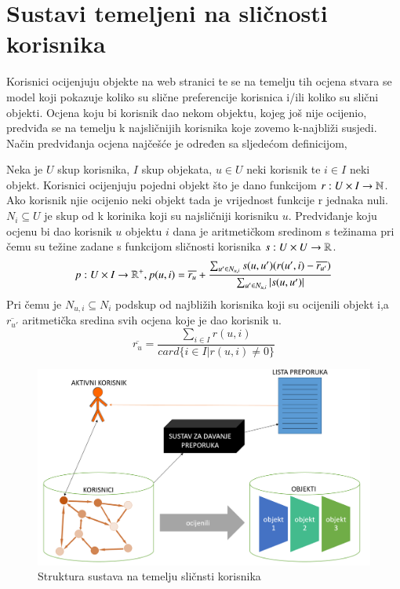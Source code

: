 \documentclass[a4paper,oneside,12pt]{memoir} %
\begin{document}
\section{Sustavi temeljeni na sličnosti korisnika}
%
Korisnici ocijenjuju objekte na web stranici te se na temelju tih ocjena stvara se model koji pokazuje koliko su slične preferencije korisnica i/ili koliko su slični objekti. Ocjena koju bi korisnik dao nekom objektu, kojeg još nije ocijenio, predviđa se na temelju k najsličnijih korisnika koje zovemo k-najbliži susjedi. Način predviđanja ocjena najčešće je određen sa sljedećom definicijom,
\begin{defn}
Neka je $U$ skup korisnika, $I$ skup objekata, $u\in U$ neki korisnik te $i\in I$ neki objekt. Korisnici ocijenjuju pojedni objekt što je dano funkcijom $r:U\times I \rightarrow \mathbb{N}$. Ako korisnik njie ocijenio neki objekt tada je vrijednost funkcije r jednaka nuli. $N_i \subseteq U$ je skup od k korinika koji su najsličniji korisniku $u$. Predviđanje koju ocjenu bi dao korisnik $u$ objektu $i$ dana je aritmetičkom sredinom s težinama pri čemu su težine zadane s funkcijom sličnosti korisnika $s:U\times U\rightarrow \mathbb{R}$. 
\[ p:U\times I \rightarrow \mathbb{R}^+, p(u,i) = \overline{r_{u}}+\frac{\sum_{u'\in N_{u,i}}s(u,u')(r(u',i)-\overline{r_{u'}})}{\sum_{u'\in N_{u,i}}|s(u,u')|} \]
Pri čemu je $N_{u,i} \subseteq N_i$ podskup od najbližih korisnika koji su ocijenili objekt i,a $\overline{r_{u'}}$ aritmetička sredina svih ocjena koje je dao korisnik u.
\[ \overline{r_{u}}=\frac{\sum_{i\in I}r(u,i)}{card\{i\in I | r(u,i) \neq 0 \} } \]
\end{defn}
\begin{figure}
\begin{center}
\includegraphics[scale=0.4]{slike/user-based.png}
\caption{Struktura sustava na temelju sličnsti korisnika}
\end{center}
\end{figure}
\end{document}

